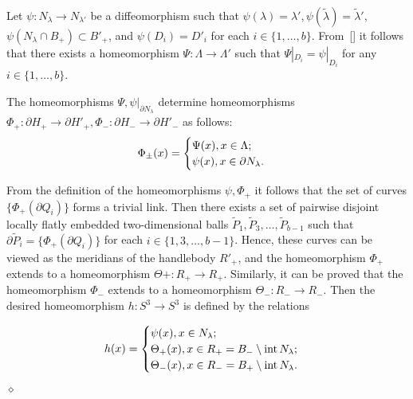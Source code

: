 \documentclass[%
 aip,
 amsmath,amssymb,
preprint,%
]{revtex4-1}
\newenvironment{proof}{{\bf Proof:}}
{\hfill $\diamond$\medskip}
\begin{document}
\begin{proof}
Let $\psi:N_\lambda\to  N_{\lambda'}$ be a diffeomorphism such that $\psi(\lambda)=\lambda', \psi(\tilde \lambda)=\tilde \lambda'$, $\psi(N_{\lambda}\cap B_+)\subset B'_+$, and $\psi(D_i)=D'_i$ for each $i\in \{1,\dots, b\}$. From~[] it follows that there exists a homeomorphism $\Psi: \Lambda\to \Lambda'$ such that $\Psi|_{D_i}=\psi|_{D_i}$ for any $i\in \{1,\dots, b\}$.

The homeomorphisms $\Psi, \psi|_{\partial N_\lambda}$ determine homeomorphisms $\Phi_+: \partial H_{+}\to \partial H'_+, \Phi_-: \partial H_{-}\to \partial H'_-$ as follows:
\begin{equation}
\Phi_{\pm}(x)=\begin{cases} \Psi(x), x\in \Lambda;\cr
\psi(x), x\in \partial N_\lambda.
\end{cases}
\end{equation}

From the definition of the homeomorphisms $\psi, \Phi_{+}$ it follows that the set of curves $\{\Phi_{+}(\partial Q_i)\}$ forms a trivial link. Then there exists a set of pairwise disjoint locally flatly embedded two-dimensional balls $\widetilde P_1,\widetilde P_3, \dots, \widetilde P_{b-1}$ such that $\partial \widetilde P_i=\{\Phi_+(\partial Q_i)\}$ for each $i\in\{1,3,\dots, b-1\}$. Hence,  these curves can be viewed as the meridians of the handlebody $R'_+$, and the homeomorphism $\Phi_+$ extends to a homeomorphism $\Theta+:R_+\to R_+$. Similarly, it can be proved that the homeomorphism $\Phi_-$ extends to a homeomorphism $\Theta_-:R_-\to R_-$. Then the desired homeomorphism $h:S^3\to S^3$ is defined by the relations

\begin{equation}
h(x)=\begin{cases} \psi(x), x\in N_\lambda;\cr
\Theta_+(x), x\in R_+=B_-\setminus {\rm int}\,N_\lambda;\cr
\Theta_-(x), x\in R_-=B_+\setminus {\rm int}\, N_\lambda.
\end{cases}
\end{equation}
\end{proof}
\end{document}

